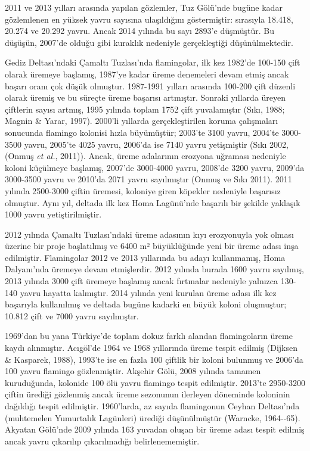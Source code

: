 \documentclass[
  a4paper,
  DIV=11,
  numbers=noendperiod]{scrreprt}
\begin{document}
2011 ve 2013 yılları arasında yapılan gözlemler, Tuz Gölü'nde bugüne
kadar gözlemlenen en yüksek yavru sayısına ulaşıldığını göstermiştir:
sırasıyla 18.418, 20.274 ve 20.292 yavru. Ancak 2014 yılında bu sayı
2893'e düşmüştür. Bu düşüşün, 2007'de olduğu gibi kuraklık nedeniyle
gerçekleştiği düşünülmektedir.

Gediz Deltası'ndaki Çamaltı Tuzlası'nda flamingolar, ilk kez 1982'de
100-150 çift olarak üremeye başlamış, 1987'ye kadar üreme denemeleri
devam etmiş ancak başarı oranı çok düşük olmuştur. 1987-1991 yılları
arasında 100-200 çift düzenli olarak üremiş ve bu süreçte üreme başarısı
artmıştır. Sonraki yıllarda üreyen çiftlerin sayısı artmış, 1995 yılında
toplam 1752 çift yuvalamıştır (Sıkı, 1988; Magnin \& Yarar, 1997).
2000'li yıllarda gerçekleştirilen koruma çalışmaları sonucunda flamingo
kolonisi hızla büyümüştür; 2003'te 3100 yavru, 2004'te 3000-3500 yavru,
2005'te 4025 yavru, 2006'da ise 7140 yavru yetişmiştir (Sıkı 2002,
(Onmuş \emph{et al.}, 2011)). Ancak, üreme adalarının erozyona uğraması
nedeniyle koloni küçülmeye başlamış, 2007'de 3000-4000 yavru, 2008'de
3200 yavru, 2009'da 3000-3500 yavru ve 2010'da 2071 yavru sayılmıştır
(Onmuş ve Sıkı 2011). 2011 yılında 2500-3000 çiftin üremesi, koloniye
giren köpekler nedeniyle başarısız olmuştur. Aynı yıl, deltada ilk kez
Homa Lagünü'nde başarılı bir şekilde yaklaşık 1000 yavru
yetiştirilmiştir.

2012 yılında Çamaltı Tuzlası'ndaki üreme adasının kıyı erozyonuyla yok
olması üzerine bir proje başlatılmış ve 6400 m² büyüklüğünde yeni bir
üreme adası inşa edilmiştir. Flamingolar 2012 ve 2013 yıllarında bu
adayı kullanmamış, Homa Dalyanı'nda üremeye devam etmişlerdir. 2012
yılında burada 1600 yavru sayılmış, 2013 yılında 3000 çift üremeye
başlamış ancak fırtınalar nedeniyle yalnızca 130-140 yavru hayatta
kalmıştır. 2014 yılında yeni kurulan üreme adası ilk kez başarıyla
kullanılmış ve deltada bugüne kadarki en büyük koloni oluşmuştur; 10.812
çift ve 7000 yavru sayılmıştır.

1969'dan bu yana Türkiye'de toplam dokuz farklı alandan flamingoların
üreme kaydı alınmıştır. Acıgöl'de 1964 ve 1968 yıllarında üreme tespit
edilmiş (Dijksen \& Kasparek, 1988), 1993'te ise en fazla 100 çiftlik
bir koloni bulunmuş ve 2006'da 100 yavru flamingo gözlenmiştir. Akşehir
Gölü, 2008 yılında tamamen kuruduğunda, kolonide 100 ölü yavru flamingo
tespit edilmiştir. 2013'te 2950-3200 çiftin ürediği gözlenmiş ancak
üreme sezonunun ilerleyen döneminde koloninin dağıldığı tespit
edilmiştir. 1960'larda, az sayıda flamingonun Ceyhan Deltası'nda
(muhtemelen Yumurtalık Lagünleri) ürediği düşünülmüştür (Warncke,
1964-\/-65). Akyatan Gölü'nde 2009 yılında 163 yuvadan oluşan bir üreme
adası tespit edilmiş ancak yavru çıkarılıp çıkarılmadığı
belirlenememiştir.
\end{document}
